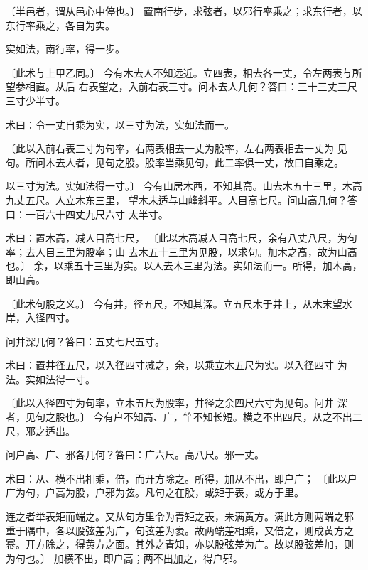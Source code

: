 \documentclass[12pt,UTF8]{ctexbook}
\begin{document}
〔半邑者，谓从邑心中停也。〕 置南行步，求弦者，以邪行率乘之；求东行者，以东行率乘之，各自为实。

实如法，南行率，得一步。

〔此术与上甲乙同。〕 今有木去人不知远近。立四表，相去各一丈，令左两表与所望参相直。从后 右表望之，入前右表三寸。问木去人几何？答曰：三十三丈三尺三寸少半寸。

术曰：令一丈自乘为实，以三寸为法，实如法而一。

〔此以入前右表三寸为句率，右两表相去一丈为股率，左右两表相去一丈为 见句。所问木去人者，见句之股。股率当乘见句，此二率俱一丈，故曰自乘之。

以三寸为法。实如法得一寸。〕 今有山居木西，不知其高。山去木五十三里，木高九丈五尺。人立木东三里， 望木末适与山峰斜平。人目高七尺。问山高几何？答曰：一百六十四丈九尺六寸 太半寸。

术曰：置木高，减人目高七尺， 〔此以木高减人目高七尺，余有八丈八尺，为句率；去人目三里为股率；山 去木五十三里为见股，以求句。加木之高，故为山高也。〕 余，以乘五十三里为实。以人去木三里为法。实如法而一。所得，加木高， 即山高。

〔此术句股之义。〕 今有井，径五尺，不知其深。立五尺木于井上，从木末望水岸，入径四寸。

问井深几何？答曰：五丈七尺五寸。

术曰：置井径五尺，以入径四寸减之，余，以乘立木五尺为实。以入径四寸 为法。实如法得一寸。

〔此以入径四寸为句率，立木五尺为股率，井径之余四尺六寸为见句。问井 深者，见句之股也。〕 今有户不知高、广，竿不知长短。横之不出四尺，从之不出二尺，邪之适出。

问户高、广、邪各几何？答曰：广六尺。高八尺。邪一丈。

术曰：从、横不出相乘，倍，而开方除之。所得，加从不出，即户广； 〔此以户广为句，户高为股，户邪为弦。凡句之在股，或矩于表，或方于里。

连之者举表矩而端之。又从句方里令为青矩之表，未满黄方。满此方则两端之邪 重于隅中，各以股弦差为广，句弦差为袤。故两端差相乘，又倍之，则成黄方之 幂。开方除之，得黄方之面。其外之青知，亦以股弦差为广。故以股弦差加，则 为句也。〕 加横不出，即户高；两不出加之，得户邪。
\end{document}
